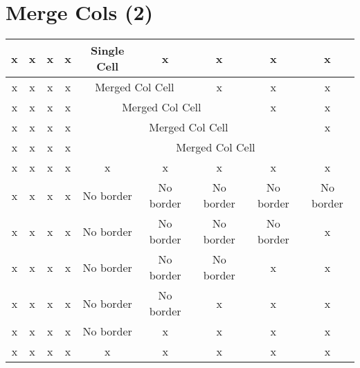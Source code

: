 \documentclass[a4paper,10pt]{scrartcl}
\begin{document}
\section{Merge Cols (2)}
\begin{tabular}{|c|c|c|c|c|c|c|c|c|} \hline
x & x & x & x & Single Cell & x & x & x & x \\ \hline
x & x & x & x & \multicolumn{2}{c|}{Merged Col Cell} & x & x & x \\ \hline
x & x & x & x & \multicolumn{3}{c|}{Merged Col Cell} & x & x \\ \hline
x & x & x & x & \multicolumn{4}{c|}{Merged Col Cell} & x \\ \hline
x & x & x & x & \multicolumn{5}{c|}{Merged Col Cell} \\ \hline
x & x & x & x & x & x & x & x & x \\ \hline
x & x & x & x & \multicolumn{1}{c}{No border} & \multicolumn{1}{c}{No border} & \multicolumn{1}{c}{No border} & \multicolumn{1}{c}{No border} & \multicolumn{1}{c|}{No border} \\ \hline
x & x & x & x & \multicolumn{1}{c}{No border} & \multicolumn{1}{c}{No border} & \multicolumn{1}{c}{No border} & \multicolumn{1}{c|}{No border} & x \\ \hline
x & x & x & x & \multicolumn{1}{c}{No border} & \multicolumn{1}{c}{No border} & \multicolumn{1}{c|}{No border} & x & x \\ \hline
x & x & x & x & \multicolumn{1}{c}{No border} & No border & x & x & x \\ \hline
x & x & x & x & \multicolumn{1}{c|}{No border} & x & x & x & x \\ \hline
x & x & x & x & x & x & x & x & x \\ \hline
\end{tabular}
\newline
\end{document}
